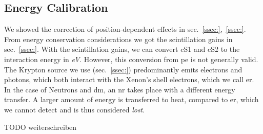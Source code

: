 
\FloatBarrier
\subsection{Energy Calibration}
\label{ssec:eng-scale}
\FloatBarrier


We showed the correction of position-dependent effects in sec.~\ref{ssec:},~\ref{ssec:}.  %
From energy conservation considerations we got the scintillation gains in sec.~\ref{ssec:}.  %
With the scintillation gains, we can convert cS1 and cS2 to the interaction energy in \textit{eV}.
However, this conversion from \gls{pe} is not generally valid.
The Krypton source we use (sec.~\ref{ssec:}) predominantly emits electrons and photons, which both interact with the Xenon's shell electrons, which we call \gls{er}. %
In the case of Neutrons and \gls{dm}, an \gls{nr} takes place with a different energy transfer.
A larger amount of energy is transferred to heat, compared to \gls{er}, which we cannot detect and is thus considered \emph{lost}.

TODO weiterschreiben





